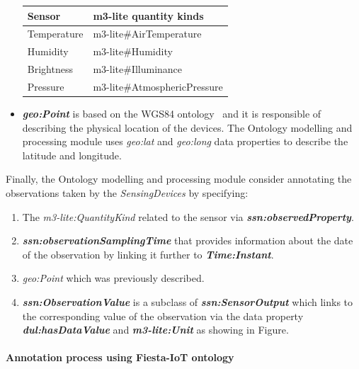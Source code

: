 \begin{itemize}
\begin{table}[htbp]
\begin{tabular}{ll}
\textbf{Sensor}   & \textbf{m3-lite quantity kinds} \\ \midrule
Temperature       & m3-lite\#AirTemperature         \\ \midrule
Humidity          & m3-lite\#Humidity               \\ \midrule
Brightness        & m3-lite\#Illuminance            \\ \midrule
Pressure          & m3-lite\#AtmosphericPressure  \\ \hline
\end{tabular}
\end{table}


\item \textbf{\textit{geo:Point}} is based on the WGS84 ontology~\cite{fiestaiot} and it is responsible of describing the physical location of the devices. The Ontology modelling and processing module uses \textit{geo:lat} and \textit{geo:long} data properties to describe the latitude and longitude.
\end{itemize}
Finally, the Ontology modelling and processing module consider annotating the observations taken by the \textit{SensingDevices} by specifying:
\begin{enumerate}
\item The \textit{m3-lite:QuantityKind} related to the sensor via \textbf{\textit{ssn:observedProperty}}.
\item \textbf{\textit{ssn:observationSamplingTime}} that provides information about the date of the observation by linking it further to \textbf{\textit{Time:Instant}}.
\item \textit{geo:Point } which was previously described.
\item \textbf{\textit{ssn:ObservationValue}} is a subclass of \textbf{\textit{ssn:SensorOutput}} which links to the corresponding value of the observation via the data property \textbf{\textit{dul:hasDataValue}} and \textbf{\textit{m3-lite:Unit}} as showing in Figure.
\end{enumerate}


\paragraph{Annotation process using Fiesta-IoT ontology}

